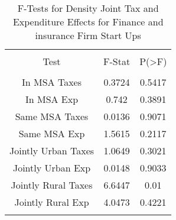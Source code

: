 
\begin{table}[!htbp] \centering 
  \caption{F-Tests for Density Joint Tax and Expenditure Effects for Finance and insurance Firm Start Ups} 
  \label{52Ftests} 
\begin{tabular}{@{\extracolsep{5pt}} ccc} 
\\[-1.8ex]\hline 
\hline \\[-1.8ex] 
Test & F-Stat & P(\textgreater F) \\ 
\hline \\[-1.8ex] 
In MSA Taxes & 0.3724 & 0.5417 \\ 
In MSA Exp & 0.742 & 0.3891 \\ 
Same MSA Taxes & 0.0136 & 0.9071 \\ 
Same MSA Exp & 1.5615 & 0.2117 \\ 
Jointly Urban Taxes & 1.0649 & 0.3021 \\ 
Jointly Urban Exp & 0.0148 & 0.9033 \\ 
Jointly Rural Taxes & 6.6447 & 0.01 \\ 
Jointly Rural Exp & 4.0473 & 0.4221 \\ 
\hline \\[-1.8ex] 
\end{tabular} 
\end{table} 
